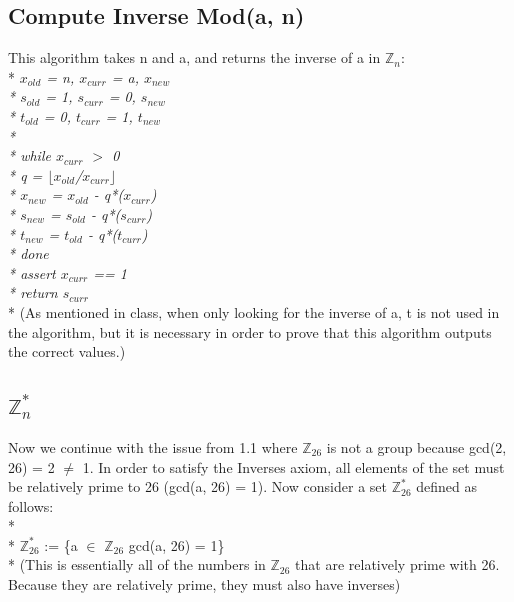 \documentclass[11pt]{article}
\begin{document}
\subsection{Compute Inverse Mod(a, n)}
This algorithm takes n and a, and returns the
inverse of a in $\mathbb{Z}_{n}$:\\*
\emph{\indent $x_{old}$ = n, $x_{curr}$ = a, $x_{new}$\\*
\indent $s_{old}$ = 1, $s_{curr}$ = 0, $s_{new}$\\*
\indent $t_{old}$ = 0, $t_{curr}$ = 1, $t_{new}$\\*\\*
\indent while $x_{curr}$ $>$ 0\\*
\indent \indent q = $\lfloor$$x_{old}$/$x_{curr}$$\rfloor$\\*
\indent \indent $x_{new}$ = $x_{old}$ - q*($x_{curr}$)\\*
\indent \indent $s_{new}$ = $s_{old}$ - q*($s_{curr}$)\\*
\indent \indent $t_{new}$ = $t_{old}$ - q*($t_{curr}$)\\*
\indent done\\*
\indent assert $x_{curr}$ == 1\\*
\indent return $s_{curr}$}\\*
(As mentioned in class, when only looking for the inverse of a, t is not used
in the algorithm, but it is necessary in order to prove that this algorithm
outputs the correct values.)

\subsection{$\mathbb{Z}^*_{n}$}
Now we continue with the issue from 1.1 where $\mathbb{Z}_{26}$ is not a group
because gcd(2, 26) = 2 $\neq$ 1.  In order to satisfy the Inverses axiom, all
elements of the set must be relatively prime to 26 (gcd(a, 26) = 1).  Now
consider a set $\mathbb{Z}^*_{26}$ defined as follows:\\*\\*
\indent $\mathbb{Z}^*_{26}$ := \{a $\in$ $\mathbb{Z}_{26}$
 gcd(a, 26) = 1\}\\*
(This is essentially all of the numbers in $\mathbb{Z}_{26}$ that are
relatively prime with 26.  Because they are relatively prime, they must
also have inverses)
\end{document}
